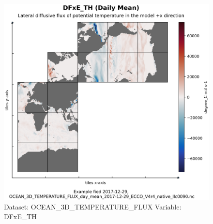 \begin{figure}[H]
\centering
\includegraphics[width=\textwidth]{../images/plots/native_plots/Ocean_Three-Dimensional_Potential_Temperature_Fluxes/DFxE_TH.png}
\caption{Dataset: OCEAN\_3D\_TEMPERATURE\_FLUX Variable: DFxE\_TH}
\label{tab:table-OCEAN_3D_TEMPERATURE_FLUX_DFxE_TH-Plot}
\end{figure}
\pagebreak
